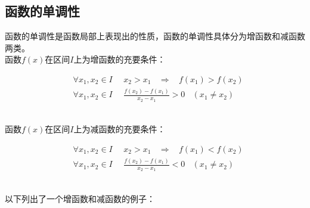 \documentclass[UTF8]{ctexart}
\begin{document}
\subsection{函数的单调性}
    函数的单调性是函数局部上表现出的性质，函数的单调性具体分为增函数和减函数两类。\\[3mm]
    函数$f(x)$在区间$I$上为增函数的充要条件：\vspace{3pt}
    \begin{large}
        \begin{align*}
            &\forall x_1,x_2\in I~~~~~~x_2>x_1~~~~\Longrightarrow~~~~f(x_1)>f(x_2)\\[6mm]
            &\forall x_1,x_2\in I~~~~~~\frac{f(x_2)-f(x_1)}{x_2-x_1}>0~~~~(x_1\neq x_2)
        \end{align*}
    \end{large}\\
    函数$f(x)$在区间$I$上为减函数的充要条件：\vspace{3pt}
    \begin{large}
        \begin{align*}
            &\forall x_1,x_2\in I~~~~~~x_2>x_1~~~~\Longrightarrow~~~~f(x_1)<f(x_2)\\[6mm]
            &\forall x_1,x_2\in I~~~~~~\frac{f(x_2)-f(x_1)}{x_2-x_1}<0~~~~(x_1\neq x_2)
        \end{align*}
    \end{large}\\
    以下列出了一个增函数和减函数的例子：
\end{document}
